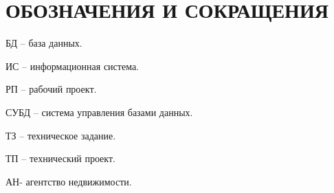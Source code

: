 \section*{ОБОЗНАЧЕНИЯ И СОКРАЩЕНИЯ}

БД – база данных.

ИС – информационная система.

РП – рабочий проект.

СУБД – система управления базами данных. 

ТЗ – техническое задание.

ТП – технический проект.

АН- агентство недвижимости.
